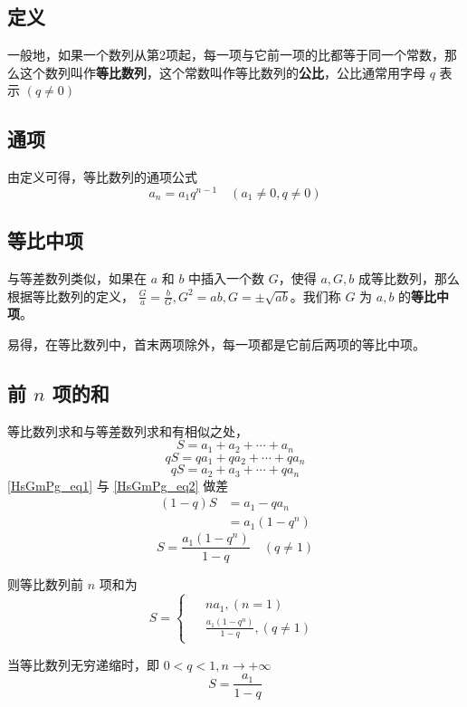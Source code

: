 

\subsection{定义}
一般地，如果一个数列从第2项起，每一项与它前一项的比都等于同一个常数，那么这个数列叫作\textbf{等比数列}，这个常数叫作等比数列的\textbf{公比}，公比通常用字母 $q$ 表示 $(q\ne 0)$

\subsection{通项}
由定义可得，等比数列的通项公式
\begin{equation}
a_n = a_1 q^{n-1} \quad (a_1 \ne 0,q\ne 0)
\end{equation}

\subsection{等比中项}
与等差数列类似，如果在 $a$ 和 $b$ 中插入一个数 $G$，使得 $a,G,b$ 成等比数列，那么根据等比数列的定义， $\frac{G}{a} = \frac{b}{G},G^2 = ab,G = \pm \sqrt{ab}$。我们称 $G$ 为 $a,b$ 的\textbf{等比中项}。

易得，在等比数列中，首末两项除外，每一项都是它前后两项的等比中项。

\subsection{前 $n$ 项的和}
等比数列求和与等差数列求和有相似之处，
\begin{equation}\label{HsGmPg_eq1}
S = a_1 + a_2 + \cdots + a_n
\end{equation}
\begin{equation}
qS = qa_1 + qa_2 + \cdots + qa_n
\end{equation}
\begin{equation}\label{HsGmPg_eq2}
qS= a_2 + a_3 + \cdots + qa_n
\end{equation}
\autoref{HsGmPg_eq1} 与 \autoref{HsGmPg_eq2} 做差
\begin{equation}
\begin{aligned}
(1 - q)S &= a_1 - qa_n\\
&= a_1(1 - q^n)
\end{aligned}
\end{equation}
\begin{equation}
S = \frac{a_1(1-q^n)}{1-q} \quad (q\neq 1)
\end{equation}

则等比数列前 $n$ 项和为
\begin{equation}
S = 
\begin{cases}
\begin{aligned}
&na_1,(n = 1) \\
&\frac{a_1(1-q^n)}{1-q},(q \neq 1)
\end{aligned}
\end{cases}
\end{equation}

当等比数列无穷递缩时，即 $0<q<1,n\rightarrow +\infty$
\begin{equation}
S = \frac{a_1}{1 - q}
\end{equation}